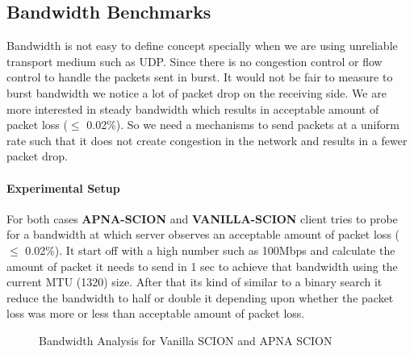 \subsection{Bandwidth Benchmarks}
Bandwidth is not easy to define concept specially when we are using unreliable transport medium such as UDP. Since there is no congestion control or flow control to handle the packets sent in burst. It would not be fair to measure to burst bandwidth we notice a lot of packet drop on the receiving side. We are more interested in steady bandwidth which results in acceptable amount of packet loss ($\leq$ 0.02\%). So we need a mechanisms to send packets at a uniform rate such that it does not create congestion in the network and results in a fewer packet drop.

\paragraph{Experimental Setup}
For both cases \textbf{APNA-SCION} and \textbf{VANILLA-SCION} client tries to probe for a bandwidth at which server observes an acceptable amount of packet loss ($\leq$ 0.02\%). It start off with a high number such as 100Mbps and calculate the amount of packet it needs to send in 1 sec to achieve that bandwidth using the current MTU (1320) size. After that its kind of similar to a binary search it reduce the bandwidth to half or double it depending upon whether the packet loss was more or less than acceptable amount of packet loss.

\begin{figure}[th!!]
\centering
\noindent
{}
\decoRule
\caption[Bandwidth Analysis]{Bandwidth Analysis for Vanilla SCION and APNA SCION}
\label{fig:perf_bandwidth}
\end{figure}

